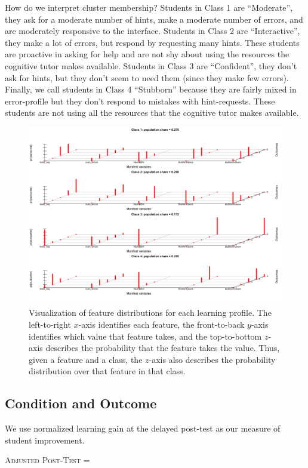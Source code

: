 \documentclass{edm_template}
\begin{document}
How do we interpret cluster membership? Students in Class 1 are ``Moderate'', they ask for a moderate number of hints, make a moderate number of errors, and are moderately responsive to the interface. Students in Class 2 are ``Interactive'', they make a lot of errors, but respond by requesting many hints. These students are proactive in asking for help and are not shy about using the resources the cognitive tutor makes available. Students in Class 3 are ``Confident'', they don't ask for hints, but they don't seem to need them (since they make few errors). Finally, we call students in Class 4 ``Stubborn'' because they are fairly mixed in error-profile but they don't respond to mistakes with hint-requests. These students are not using all the resources that the cognitive tutor makes available.

\begin{figure}[t]
\centering
\includegraphics[scale=0.5]{LCa-class-viz.png}
\caption{Visualization of feature distributions for each learning profile. The left-to-right $x$-axis identifies each feature, the front-to-back $y$-axis identifies which value that feature takes, and the top-to-bottom $z$-axis describes the probability that the feature takes the value. Thus, given a feature and a class, the $z$-axis also describes the probability distribution over that feature in that class.}
\label{fig:LCa-class-viz}
\end{figure}


\subsection{Condition and Outcome} 
We use normalized learning gain at the delayed post-test as our measure of student improvement. 
\begin{center}
\textsc{Adjusted Post-Test} = 
\end{center}
\end{document}
